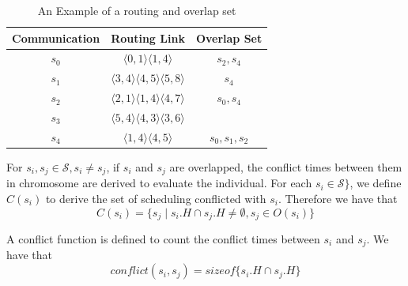 \documentclass[journal]{IEEEtran}
\newcommand{\calS}{\mathcal{S}}
\begin{document}
\begin{table}[!t]
	\renewcommand{\arraystretch}{1.3}
	\caption{An Example of a routing and overlap set}
	\label{t:overlap}
	\centering
	\begin{tabular}{|c||c||c|}
		\hline
		\textbf{Communication} & \textbf{Routing Link}& \textbf{Overlap Set}\\
		\hline
		$s_{0}$ & $ \langle 0,1\rangle\langle 1,4\rangle$ 		& $s_{2},s_{4}$ \\
		\hline
		$s_{1}$ & $ \langle 3,4\rangle\langle 4,5\rangle\langle 5,8\rangle$	& $s_{4}$ \\
		\hline
		$s_{2}$ & $ \langle 2,1\rangle\langle 1,4\rangle\langle 4,7\rangle$ 	& $s_{0},s_{4}$ \\
		\hline		
		$s_{3}$ & $ \langle 5,4\rangle\langle 4,3\rangle\langle 3,6\rangle$ 	& \\
		\hline
		$s_{4}$ & $ \langle 1,4\rangle\langle 4,5\rangle$ 		& $s_{0},s_{1},s_{2}$ \\
		\hline		
	\end{tabular}
\end{table}

For $s_{i},s_{j}\in \calS, s_{i}\neq s_{j}$,
if $s_i$ and $s_j$ are overlapped,
the conflict times between them in chromosome are derived to evaluate the individual.
For each $s_{i}\in \calS\}$,
 we define $C(s_{i})$ to derive the set of scheduling conflicted with $s_{i}$. Therefore we have that
\begin{equation}
	C(s_i) = \{ s_j \mid s_i.H \cap s_j.H \neq \emptyset  ,s_j\in O(s_i) \}
\end{equation}
   
A conflict function is defined to count the conflict times between $s_i$ and $s_j$.
We have that
\begin{equation}
	conflict(s_i,s_j) = sizeof \{s_i.H \cap s_j.H\}
\end{equation}
\end{document}
